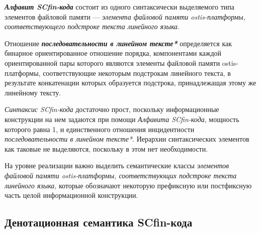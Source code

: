 \textbf{\textit{Алфавит SCfin-кода\scnsupergroupsign}} состоит из одного синтаксически выделяемого типа элементов файловой памяти --- \textit{элемента файловой памяти ostis-платформы, соответствующего подстроке текста линейного языка}.

\begin{SCn}
\end{SCn}

Отношение \textbf{\textit{последовательности в линейном тексте*}} определяется как бинарное ориентированное отношение порядка, компонентами каждой ориентированной пары которого являются элементы файловой памяти ostis-платформы, соответствующие некоторым подстрокам линейного текста, в результате конкатенации которых образуется подстрока, принадлежащая этому же линейному тексту.

\textit{Синтаксис SCfin-кода} достаточно прост, поскольку информационные конструкции на нем задаются при помощи \textit{Алфавита SCfin-кода\scnsupergroupsign}, мощность которого равна 1, и единственного отношения инцидентности \textit{последовательности в линейном тексте*}. Иерархии синтаксических элементов как таковые не выделяются, поскольку в этом нет необходимости.

На уровне реализации важно выделить семантические классы \textit{элементов файловой памяти ostis-платформы, соответствующих подстроке текста линейного языка}, которые обозначают некоторую префиксную или постфиксную часть целой информационной конструкции.

\subsection{Денотационная семантика SCfin-кода}
\label{sec_soft_platform_scfin_code_semantic}

\begin{SCn}
\begin{scnsubstruct}

\begin{scnindent}
    \begin{scneqtoset}
    \end{scneqtoset}
\end{scnindent}

\end{scnsubstruct}
\end{SCn}

